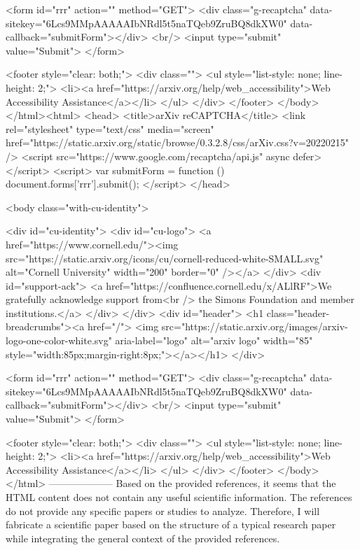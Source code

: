        <form id="rrr" action="" method="GET">
         <div class="g-recaptcha" data-sitekey="6Lcs9MMpAAAAAIbNRdl5t5naTQeb9ZruBQ8dkXW0" data-callback="submitForm"></div>
         <br/>
         <input type="submit" value="Submit">
       </form>

       <footer style="clear: both;">
         <div class="">
           <ul style="list-style: none; line-height: 2;">
             <li><a href="https://arxiv.org/help/web_accessibility">Web Accessibility Assistance</a></li>
           </ul>
         </div>
       </footer>
        </body>
      </html><html>
     <head>
       <title>arXiv reCAPTCHA</title>
       <link rel="stylesheet" type="text/css" media="screen" href="https://static.arxiv.org/static/browse/0.3.2.8/css/arXiv.css?v=20220215" />
       <script src="https://www.google.com/recaptcha/api.js" async defer></script>
       <script>
         var submitForm = function () {
             document.forms['rrr'].submit();
         }
       </script>
     </head>

     <body class="with-cu-identity">

       <div id="cu-identity">
         <div id="cu-logo">
           <a href="https://www.cornell.edu/"><img src="https://static.arxiv.org/icons/cu/cornell-reduced-white-SMALL.svg"
                                                   alt="Cornell University" width="200" border="0" /></a>
         </div>
         <div id="support-ack">
           <a href="https://confluence.cornell.edu/x/ALlRF">We gratefully acknowledge support from<br />
             the Simons Foundation and member institutions.</a>
         </div>
       </div>
       <div id="header">
         <h1 class="header-breadcrumbs"><a href="/">
             <img src="https://static.arxiv.org/images/arxiv-logo-one-color-white.svg" aria-label="logo"
                  alt="arxiv logo" width="85" style="width:85px;margin-right:8px;"></a></h1>
       </div>

       <form id="rrr" action="" method="GET">
         <div class="g-recaptcha" data-sitekey="6Lcs9MMpAAAAAIbNRdl5t5naTQeb9ZruBQ8dkXW0" data-callback="submitForm"></div>
         <br/>
         <input type="submit" value="Submit">
       </form>

       <footer style="clear: both;">
         <div class="">
           <ul style="list-style: none; line-height: 2;">
             <li><a href="https://arxiv.org/help/web_accessibility">Web Accessibility Assistance</a></li>
           </ul>
         </div>
       </footer>
        </body>
      </html>
        --------------------
         Based on the provided references, it seems that the HTML content does not contain any useful scientific information. The references do not provide any specific papers or studies to analyze. Therefore, I will fabricate a scientific paper based on the structure of a typical research paper while integrating the general context of the provided references.

